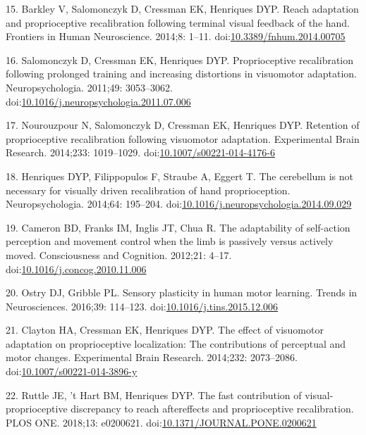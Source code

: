 \documentclass[10pt,letterpaper]{article}
\begin{document}
\hypertarget{ref-Barkley2014}{}
15. Barkley V, Salomonczyk D, Cressman EK, Henriques DYP. Reach
adaptation and proprioceptive recalibration following terminal visual
feedback of the hand. Frontiers in Human Neuroscience. 2014;8: 1--11.
doi:\href{https://doi.org/10.3389/fnhum.2014.00705}{10.3389/fnhum.2014.00705}

\hypertarget{ref-Salomonczyk2011}{}
16. Salomonczyk D, Cressman EK, Henriques DYP. Proprioceptive
recalibration following prolonged training and increasing distortions in
visuomotor adaptation. Neuropsychologia. 2011;49: 3053--3062.
doi:\href{https://doi.org/10.1016/j.neuropsychologia.2011.07.006}{10.1016/j.neuropsychologia.2011.07.006}

\hypertarget{ref-Nourouzpour2014}{}
17. Nourouzpour N, Salomonczyk D, Cressman EK, Henriques DYP. Retention
of proprioceptive recalibration following visuomotor adaptation.
Experimental Brain Research. 2014;233: 1019--1029.
doi:\href{https://doi.org/10.1007/s00221-014-4176-6}{10.1007/s00221-014-4176-6}

\hypertarget{ref-Henriques2014}{}
18. Henriques DYP, Filippopulos F, Straube A, Eggert T. The cerebellum
is not necessary for visually driven recalibration of hand
proprioception. Neuropsychologia. 2014;64: 195--204.
doi:\href{https://doi.org/10.1016/j.neuropsychologia.2014.09.029}{10.1016/j.neuropsychologia.2014.09.029}

\hypertarget{ref-Cameron2012}{}
19. Cameron BD, Franks IM, Inglis JT, Chua R. The adaptability of
self-action perception and movement control when the limb is passively
versus actively moved. Consciousness and Cognition. 2012;21: 4--17.
doi:\href{https://doi.org/10.1016/j.concog.2010.11.006}{10.1016/j.concog.2010.11.006}

\hypertarget{ref-Ostry2016}{}
20. Ostry DJ, Gribble PL. Sensory plasticity in human motor learning.
Trends in Neurosciences. 2016;39: 114--123.
doi:\href{https://doi.org/10.1016/j.tins.2015.12.006}{10.1016/j.tins.2015.12.006}

\hypertarget{ref-Clayton2014}{}
21. Clayton HA, Cressman EK, Henriques DYP. The effect of visuomotor
adaptation on proprioceptive localization: The contributions of
perceptual and motor changes. Experimental Brain Research. 2014;232:
2073--2086.
doi:\href{https://doi.org/10.1007/s00221-014-3896-y}{10.1007/s00221-014-3896-y}

\hypertarget{ref-Ruttle2018}{}
22. Ruttle JE, 't Hart BM, Henriques DYP. The fast contribution of
visual-proprioceptive discrepancy to reach aftereffects and
proprioceptive recalibration. PLOS ONE. 2018;13: e0200621.
doi:\href{https://doi.org/10.1371/JOURNAL.PONE.0200621}{10.1371/JOURNAL.PONE.0200621}
\end{document}
